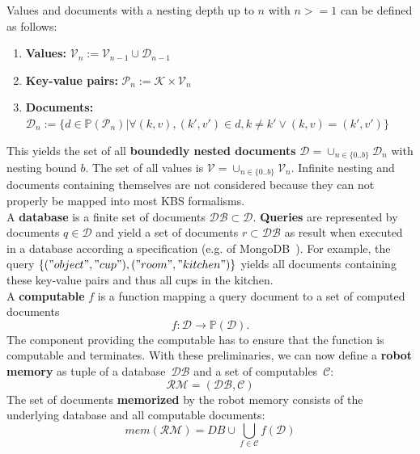 \documentclass[a4paper,11pt]{article}
\begin{document}
Values and documents with a nesting depth up to $n$ with $n>=1$ can be
defined as follows:
\begin{enumerate}
\item  \textbf{Values:} $\mathcal{V}_n := \mathcal{V}_{n-1} \cup \mathcal{D}_{n-1}$
\item \textbf{Key-value pairs:} $\mathcal{P}_n:=\mathcal{K}\times\mathcal{V}_n$
\item \textbf{Documents:}
  $\mathcal{D}_n:=\{
  d\in\mathbb{P}(\mathcal{P}_n)|
  \forall (k,v),(k',v')\in d , k\neq k' \vee (k,v)=(k',v')
  \}$
\end{enumerate}
This yields the set of all \textbf{boundedly nested documents}
$\mathcal{D}=\cup_{n\in\{0..b\}}\mathcal{D}_n$ with nesting bound $b$.
The set of all values is $\mathcal{V}=\cup_{n\in\{0..b\}}\mathcal{V}_n$.
  Infinite nesting and
documents containing themselves are not considered because they can
not properly be mapped into most KBS formalisms.
\\
A \textbf{database} is a finite set of documents $\mathcal{DB} \subset \mathcal{D}$.
\textbf{Queries} are represented by documents $q\in\mathcal{D}$ and yield a set
of documents $r\subset\mathcal{DB}$ as result when executed in a database according a
specification (e.g. of MongoDB~\cite{mongodb}). For example, the query
$\{("object","cup"),("room","kitchen")\}$ yields all documents containing these
key-value pairs and thus all cups in the kitchen.
\\
A \textbf{computable} $f$ is a function mapping a query document to a
set of computed documents
$$f: \mathcal{D} \rightarrow \mathbb{P}(\mathcal{D})\text{.}$$
The component providing the computable has to ensure that the function is computable and terminates.
%
With these preliminaries, we can now define a \textbf{robot memory} as tuple
of a database~$\mathcal{DB}$ and a set of computables~$\mathcal{C}$:
$$\mathcal{RM}=(\mathcal{DB},\mathcal{C})$$
%
The set of documents \textbf{memorized} by the robot memory consists
of the underlying database and all computable documents:
$$mem(\mathcal{RM})=DB \cup \bigcup_{f\in\mathcal{C}}f(\mathcal{D})$$
\end{document}

